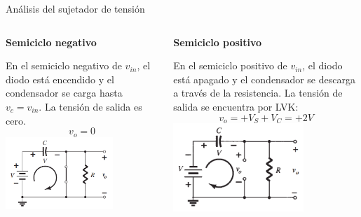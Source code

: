 \documentclass[t,aspectratio=169]{beamer}
\begin{document}
\begin{frame}{Análisis del sujetador de tensión}

\begin{columns}
\begin{column}{0.5\textwidth}

\textbf{Semiciclo negativo}

En el semiciclo negativo de $v_{in}$, el diodo está encendido y el condensador se carga hasta $v_c = v_{in}$. La tensión de salida es cero.
%
\[ v_o = 0 \]
%
\centering
\includegraphics[width=0.7\textwidth]{figures/sujetador_analisis_1.png}

\end{column}
\begin{column}{0.5\textwidth}

\textbf{Semiciclo positivo}

En el semiciclo positivo de $v_{in}$, el diodo está apagado y el condensador se descarga a través de la resistencia. La tensión de salida se encuentra por LVK:
%
\[ v_o = +V_S + V_C = +2V \]
%
\centering
\includegraphics[width=0.7\textwidth]{figures/sujetador_analisis_2.png}

\end{column}
\end{columns}

\end{frame}
\end{document}
